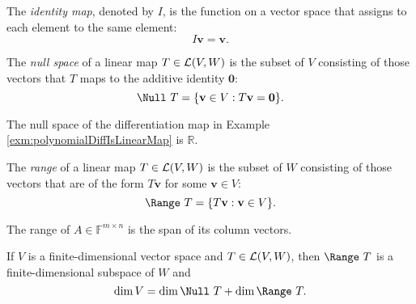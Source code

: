 \begin{defn}
   The \emph{identity map}, denoted by $I$,
    is the function on a vector space
    that assigns to each element to the same element:
    \begin{equation}
      \label{eq:identityMap}
      I\mathbf{v} = \mathbf{v}.
    \end{equation}
 \end{defn}

\begin{defn}
  \label{def:nullSpace}
  The \emph{null space} of a linear map
   \mbox{$T\in {\cal L}(V, W)$}
   is the subset of $V$ consisting of those vectors
   that $T$ maps to the additive identity $\mathbf{0}$:
   \begin{equation}
     \label{eq:nullSpace}
     \Null\ T = \{\mathbf{v}\in V : T\mathbf{v}=\mathbf{0}\}.
   \end{equation}
\end{defn}

\begin{exm}
  The null space of the differentiation map
   in Example \ref{exm:polynomialDiffIsLinearMap} is $\mathbb{R}$.
\end{exm}

\begin{defn}
  \label{def:range}
  The \emph{range} of a linear map
   \mbox{$T\in {\cal L}(V, W)$}
   is the subset of $W$ consisting of those vectors
   that are of the form $T\mathbf{v}$ for some $\mathbf{v}\in V$:
   \begin{equation}
     \label{eq:range}
     \Range\ T = \{T\mathbf{v}: \mathbf{v}\in V\}.
   \end{equation}
\end{defn}

\begin{exm}
  The range of $A\in \mathbb{F}^{m\times n}$
   is the span of its column vectors.
\end{exm}

\begin{thm}
  \label{thm:dimensionsOfNullAndRange}
  If $V$ is a finite-dimensional vector space
   and $T\in {\cal L}(V, W)$,
   then $\Range\ T$ is a finite-dimensional subspace of $W$
   and
   \begin{equation}
     \label{eq:dimensionsOfNullAndRange}
     \dim V = \dim \Null\ T + \dim \Range\ T.
   \end{equation}
\end{thm}

